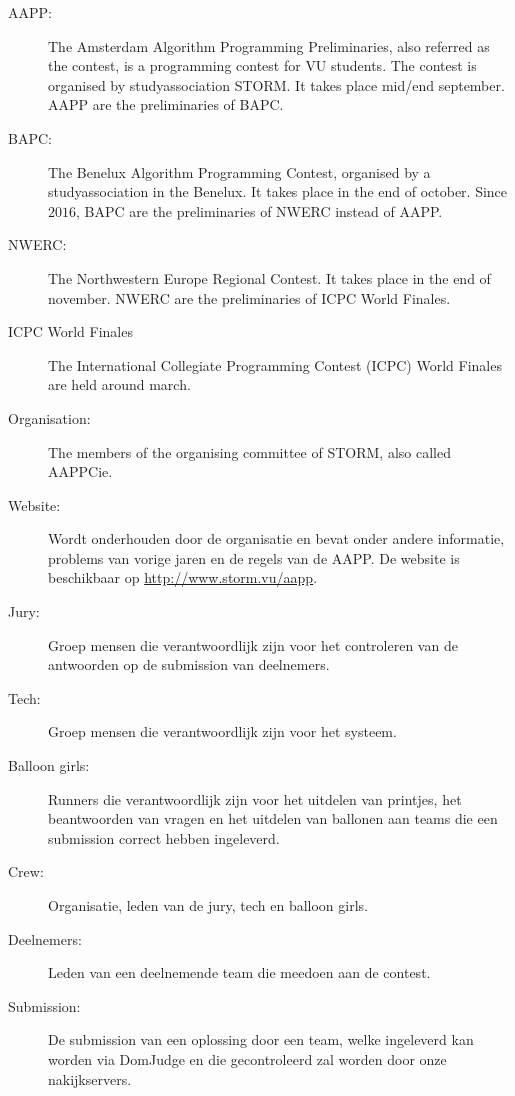 \begin{description}
\item[AAPP:]
The Amsterdam Algorithm Programming Preliminaries, also referred as the contest, is a programming contest for VU students. The contest is organised by studyassociation STORM. It takes place mid/end september. AAPP are the preliminaries of BAPC.

\item[BAPC:]
The Benelux Algorithm Programming Contest, organised by a studyassociation in the Benelux. It takes place in the end of october. Since $2016$, BAPC are the preliminaries of NWERC instead of AAPP.

\item[NWERC:]
The Northwestern Europe Regional Contest. It takes place in the end of november. NWERC are the preliminaries of ICPC World Finales.

\item[ICPC World Finales]
The International Collegiate Programming Contest (ICPC) World Finales are held around march.

\item[Organisation:]
The members of the organising committee of STORM, also called AAPPCie.

\item[Website:]
Wordt onderhouden door de organisatie en bevat onder andere informatie, problems van vorige jaren en de regels van de AAPP. De website is beschikbaar op \url{http://www.storm.vu/aapp}.

\item[Jury:]
Groep mensen die verantwoordlijk zijn voor het controleren van de antwoorden op de submission van deelnemers.

\item[Tech:]
Groep mensen die verantwoordlijk zijn voor het systeem.

\item[Balloon girls:]
Runners die verantwoordlijk zijn voor het uitdelen van printjes, het beantwoorden van vragen en het uitdelen van ballonen aan teams die een submission correct hebben ingeleverd.

\item[Crew:]
Organisatie, leden van de jury, tech en balloon girls. 

\item[Deelnemers:]
Leden van een deelnemende team die meedoen aan de contest.

\item[Submission:]
De submission van een oplossing door een team, welke ingeleverd kan worden via DomJudge  en die gecontroleerd zal worden door onze nakijkservers.
\end{description}